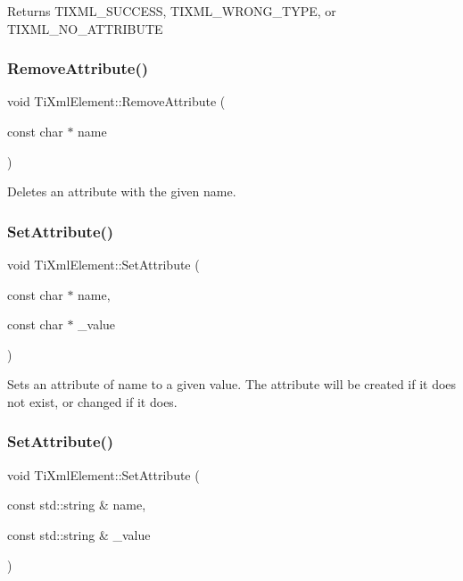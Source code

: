 \begin{DoxyReturn}{Returns}
T\+I\+X\+M\+L\+\_\+\+S\+U\+C\+C\+E\+SS, T\+I\+X\+M\+L\+\_\+\+W\+R\+O\+N\+G\+\_\+\+T\+Y\+PE, or T\+I\+X\+M\+L\+\_\+\+N\+O\+\_\+\+A\+T\+T\+R\+I\+B\+U\+TE 
\end{DoxyReturn}
\mbox{\label{class_ti_xml_element_a56979767deca794376b1dfa69a525b2a}} 
\subsubsection{\texorpdfstring{Remove\+Attribute()}{RemoveAttribute()}}
{\footnotesize\ttfamily void Ti\+Xml\+Element\+::\+Remove\+Attribute (\begin{DoxyParamCaption}\item[{const char $\ast$}]{name }\end{DoxyParamCaption})}

Deletes an attribute with the given name. \mbox{\label{class_ti_xml_element_abf0b3bd7f0e4c746a89ec6e7f101fc32}} 
\subsubsection{\texorpdfstring{Set\+Attribute()}{SetAttribute()}\hspace{0.1cm}{\footnotesize\ttfamily [1/3]}}
{\footnotesize\ttfamily void Ti\+Xml\+Element\+::\+Set\+Attribute (\begin{DoxyParamCaption}\item[{const char $\ast$}]{name,  }\item[{const char $\ast$}]{\+\_\+value }\end{DoxyParamCaption})}

Sets an attribute of name to a given value. The attribute will be created if it does not exist, or changed if it does. \mbox{\label{class_ti_xml_element_a80ed65b1d194c71c6c9986ae42337d7d}} 
\subsubsection{\texorpdfstring{Set\+Attribute()}{SetAttribute()}\hspace{0.1cm}{\footnotesize\ttfamily [2/3]}}
{\footnotesize\ttfamily void Ti\+Xml\+Element\+::\+Set\+Attribute (\begin{DoxyParamCaption}\item[{const std\+::string \&}]{name,  }\item[{const std\+::string \&}]{\+\_\+value }\end{DoxyParamCaption})}



